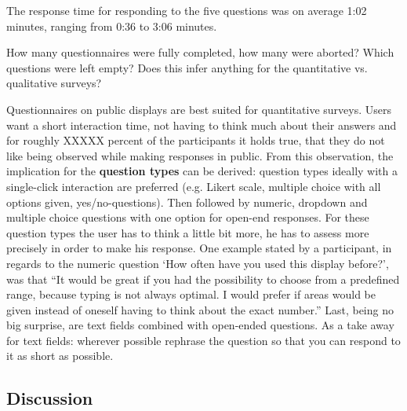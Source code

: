 	The response time for responding to the five questions was on average 1:02 minutes, ranging from 0:36 to 3:06 minutes.

	How many questionnaires were fully completed, how many were aborted? Which questions were left empty? Does this infer anything for the quantitative vs. qualitative surveys?

	
	Questionnaires on public displays are best suited for quantitative surveys. Users want a short interaction time, not having to think much about their answers and for roughly XXXXX percent of the participants it holds true, that they do not like being observed while making responses in public.
	From this observation, the implication for the \textbf{question types} can be derived: question types ideally with a single-click interaction are preferred (e.g. Likert scale, multiple choice with all options given, yes/no-questions). Then followed by numeric, dropdown and multiple choice questions with one option for open-end responses. For these question types the user has to think a little bit more, he has to assess more precisely in order to make his response. One example stated by a participant, in regards to the numeric question `How often have you used this display before?', was that ``It would be great if you had the possibility to choose from a predefined range, because typing is not always optimal. I would prefer if areas would be given instead of oneself having to think about the exact number.'' Last, being no big surprise, are text fields combined with open-ended questions. As a take away for text fields: wherever possible rephrase the question so that you can respond to it as short as possible.





\subsection{Discussion}







